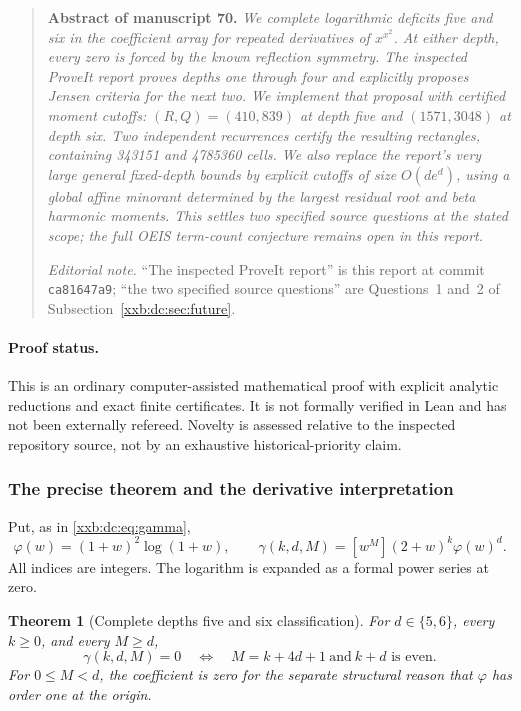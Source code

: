 \documentclass[11pt,a4paper]{article}
\numberwithin{equation}{section}
\newtheorem{theorem}{Theorem}[section]
\theoremstyle{definition}
\theoremstyle{remark}
\theoremstyle{plain}
\begin{document}
\begin{quote}\small
\textbf{Abstract of manuscript 70.}\itshape
We complete logarithmic deficits five and six in the coefficient array for
repeated derivatives of $x^{x^2}$. At either depth, every zero is forced by
the known reflection symmetry. The inspected ProveIt report proves depths one
through four and explicitly proposes Jensen criteria for the next two. We
implement that proposal with certified moment cutoffs: $(R,Q)=(410,839)$ at
depth five and $(1571,3048)$ at depth six. Two independent recurrences
certify the resulting rectangles, containing 343151 and 4785360 cells. We
also replace the report's very large general fixed-depth bounds by explicit
cutoffs of size $O(de^d)$, using a global affine minorant determined by the
largest residual root and beta harmonic moments. This settles two specified
source questions at the stated scope; the full OEIS term-count conjecture
remains open in this report.
\upshape\par
\smallskip
\emph{Editorial note.}  ``The inspected ProveIt report'' is this report at
commit \texttt{ca81647a9}; ``the two specified source questions'' are
Questions~1 and~2 of Subsection~\ref{xxb:dc:sec:future}.
\end{quote}

\paragraph{Proof status.}
This is an ordinary computer-assisted mathematical proof with explicit
analytic reductions and exact finite certificates. It is not formally verified
in Lean and has not been externally refereed. Novelty is assessed relative to
the inspected repository source, not by an exhaustive historical-priority
claim.

\subsubsection{The precise theorem and the derivative interpretation}

Put, as in \eqref{xxb:dc:eq:gamma},
\[
 \varphi(w)=(1+w)^2\log(1+w),\qquad
 \gamma(k,d,M)=[w^M](2+w)^k\varphi(w)^d.
\]
All indices are integers. The logarithm is expanded as a formal power series
at zero.

\begin{theorem}[Complete depths five and six classification]\label{xxb:d56:thm:main}
For $d\in\{5,6\}$, every $k\ge0$, and every $M\ge d$,
\[
 \gamma(k,d,M)=0
 \quad\Longleftrightarrow\quad M=k+4d+1\ \text{and}\ k+d\text{ is even}.
\]
For $0\le M<d$, the coefficient is zero for the separate structural reason
that $\varphi$ has order one at the origin.
\end{theorem}
\end{document}
